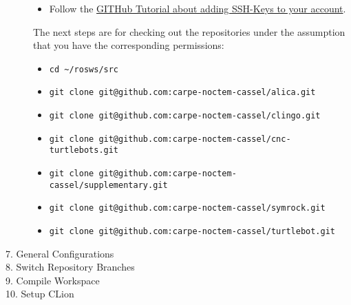 \begin{description}
\begin{itemize}
		\item Follow the \href{https://help.github.com/articles/adding-a-new-ssh-key-to-your-github-account/}{GITHub Tutorial about adding SSH-Keys to your account}.
	\end{itemize}
	The next steps are for checking out the repositories under the assumption that you have the corresponding permissions:
	\begin{itemize}
		\item \verb#cd ~/rosws/src#
		\item \verb#git clone git@github.com:carpe-noctem-cassel/alica.git#
		\item \verb#git clone git@github.com:carpe-noctem-cassel/clingo.git#
		\item \verb#git clone git@github.com:carpe-noctem-cassel/cnc-turtlebots.git#
		\item \verb#git clone git@github.com:carpe-noctem-cassel/supplementary.git#
		\item \verb#git clone git@github.com:carpe-noctem-cassel/symrock.git#
		\item \verb#git clone git@github.com:carpe-noctem-cassel/turtlebot.git#
	\end{itemize}
	\item[7. General Configurations]
	\item[8. Switch Repository Branches]
	\item[9. Compile Workspace]
	\item[10. Setup CLion]
\end{description}

